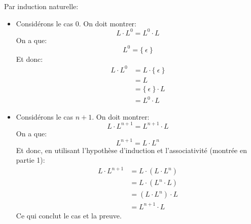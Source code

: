 \documentclass[12pt,french,a4paper]{article}
\begin{document}
\begin{question}
Par induction naturelle:
\begin{itemize}
\item
Considérons le cas $0$. On doit montrer:
\[
L \cdot L^0 = L^0 \cdot L
\]
On a que:
\[
L^0 = \{\ \epsilon\ \}
\]
Et donc:
\begin{align*}
L \cdot L^0 &= L \cdot \{\ \epsilon\ \} \\
&= L \\
&= \{\ \epsilon\ \} \cdot L\\
&= L^0 \cdot L
\end{align*}
\item
Considérons le cas $n + 1$. On doit montrer:
\[
L \cdot L^{n + 1} = L^{n + 1} \cdot L
\]
On a que:
\[
L^{n + 1} = L \cdot L^n
\]
Et donc, en utilisant l'hypothèse d'induction et l'associativité (montrée en partie 1):
\begin{align*}
L \cdot L^{n + 1} &= L \cdot (L \cdot L^n) \\
&= L \cdot (L^n \cdot L) \\
&= (L \cdot L^n) \cdot L\\
&= L^{n + 1} \cdot L
\end{align*}
Ce qui conclut le cas et la preuve.
\end{itemize}
\end{question}

\begin{question}
\end{question}
\end{document}
